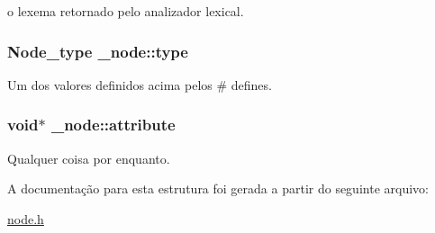o lexema retornado pelo analizador lexical. \hypertarget{struct__node_7d8402191946be24896b7517484c2d0b}{
\subsubsection{\setlength{\rightskip}{0pt plus 5cm}Node\_\-type {\bf \_\-node::type}}}
\label{struct__node_7d8402191946be24896b7517484c2d0b}


Um dos valores definidos acima pelos \# defines. \hypertarget{struct__node_8635514c1a76f9660692563ea9bb8ef1}{
\subsubsection{\setlength{\rightskip}{0pt plus 5cm}void$\ast$ {\bf \_\-node::attribute}}}
\label{struct__node_8635514c1a76f9660692563ea9bb8ef1}


Qualquer coisa por enquanto. 

A documentação para esta estrutura foi gerada a partir do seguinte arquivo:\begin{CompactItemize}
\item 
\hyperlink{node_8h}{node.h}\end{CompactItemize}

